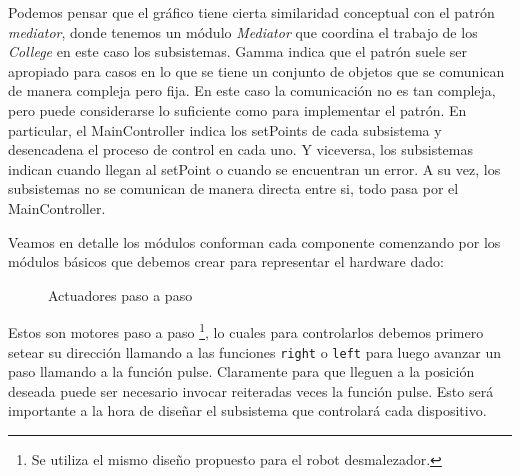 Podemos pensar que el gráfico tiene cierta similaridad conceptual con el patrón \textit{mediator}, donde tenemos un módulo \textit{Mediator} que coordina el trabajo de los \textit{College} en este caso los subsistemas. Gamma indica que el patrón suele ser apropiado para casos en lo que se tiene un conjunto de objetos que se comunican de manera compleja pero fija. En este caso la comunicación no es tan compleja, pero puede considerarse lo suficiente como para implementar el patrón. En particular, el MainController indica los setPoints de cada subsistema y desencadena el proceso de control en cada uno. Y viceversa, los subsistemas indican cuando llegan al setPoint o cuando se encuentran un error. A su vez, los subsistemas no se comunican de manera directa entre si, todo pasa por el MainController.

Veamos en detalle los módulos conforman cada componente comenzando por los módulos básicos que debemos crear para representar el hardware dado:

\begin{figure}[h]
\caption{Actuadores paso a paso}
\begin{center}
\end{center}
\end{figure}

Estos son motores paso a paso \footnote{Se utiliza el mismo diseño propuesto para el robot desmalezador.}, lo cuales para controlarlos debemos primero setear su dirección llamando a las funciones \verb|right| o \verb|left| para luego avanzar un paso llamando a la función pulse. Claramente para que lleguen a la posición deseada puede ser necesario invocar reiteradas veces la función pulse. Esto será importante a la hora de diseñar el subsistema que controlará cada dispositivo.

